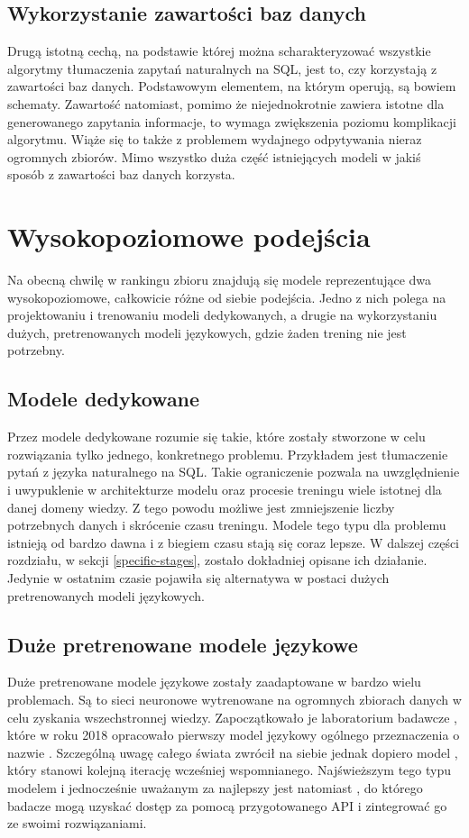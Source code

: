 \subsection{Wykorzystanie zawartości baz danych}
Drugą istotną cechą, na podstawie której można scharakteryzować wszystkie algorytmy tłumaczenia zapytań naturalnych na SQL, jest to, czy korzystają z zawartości baz danych. Podstawowym elementem, na którym operują, są bowiem schematy. Zawartość natomiast, pomimo że niejednokrotnie zawiera istotne dla generowanego zapytania informacje, to wymaga zwiększenia poziomu komplikacji algorytmu. Wiąże się to także z problemem wydajnego odpytywania nieraz ogromnych zbiorów. Mimo wszystko duża część istniejących modeli w jakiś sposób z zawartości baz danych korzysta.

\section{Wysokopoziomowe podejścia}
Na obecną chwilę w rankingu zbioru  znajdują się modele reprezentujące dwa wysokopoziomowe, całkowicie różne od siebie podejścia. Jedno z nich polega na projektowaniu i trenowaniu modeli dedykowanych, a drugie na wykorzystaniu dużych, pretrenowanych modeli językowych, gdzie żaden trening nie jest potrzebny. 

\subsection{Modele dedykowane}
Przez modele dedykowane rozumie się takie, które zostały stworzone w celu rozwiązania tylko jednego, konkretnego problemu. Przykładem jest tłumaczenie pytań z języka naturalnego na SQL. Takie ograniczenie pozwala na uwzględnienie i uwypuklenie w architekturze modelu oraz procesie treningu wiele istotnej dla danej domeny wiedzy. Z tego powodu możliwe jest zmniejszenie liczby potrzebnych danych i skrócenie czasu treningu. Modele tego typu dla problemu  istnieją od bardzo dawna i z biegiem czasu stają się coraz lepsze. W dalszej części rozdziału, w sekcji \ref{specific-stages}, zostało dokładniej opisane ich działanie. Jedynie w ostatnim czasie pojawiła się alternatywa w postaci dużych pretrenowanych modeli językowych.

\subsection{Duże pretrenowane modele językowe}
Duże pretrenowane modele językowe zostały zaadaptowane w bardzo wielu problemach. Są to sieci neuronowe wytrenowane na ogromnych zbiorach danych w celu zyskania wszechstronnej wiedzy. Zapoczątkowało je laboratorium badawcze , które w roku 2018 opracowało pierwszy model językowy ogólnego przeznaczenia o nazwie  . Szczególną uwagę całego świata zwrócił na siebie jednak dopiero model , który stanowi kolejną iterację wcześniej wspomnianego. Najświeższym tego typu modelem i jednocześnie uważanym za najlepszy jest natomiast , do którego badacze mogą uzyskać dostęp za pomocą przygotowanego API i zintegrować go ze swoimi rozwiązaniami.


